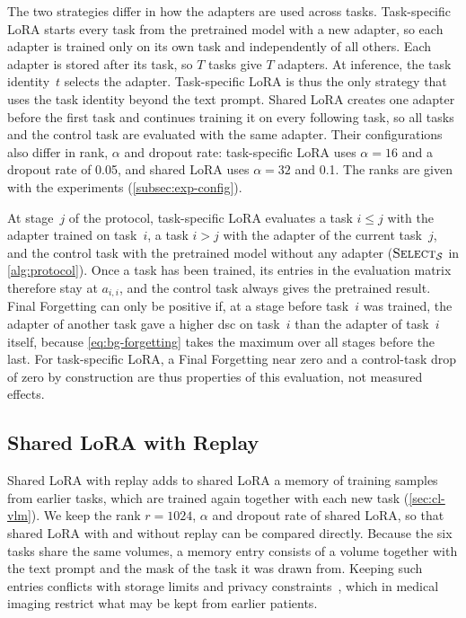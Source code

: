 The two strategies differ in how the adapters are used across tasks.
Task-specific LoRA starts every task from the pretrained model with a new adapter, so each adapter is trained only on its own task and independently of all others.
Each adapter is stored after its task, so $T$ tasks give $T$ adapters.
At inference, the task identity~$t$ selects the adapter.
Task-specific LoRA is thus the only strategy that uses the task identity beyond the text prompt.
Shared LoRA creates one adapter before the first task and continues training it on every following task, so all tasks and the control task are evaluated with the same adapter.
Their configurations also differ in rank, $\alpha$ and dropout rate: task-specific LoRA uses $\alpha = 16$ and a dropout rate of 0.05, and shared LoRA uses $\alpha = 32$ and 0.1.
The ranks are given with the experiments (\cref{subsec:exp-config}).

At stage~$j$ of the protocol, task-specific LoRA evaluates a task $i \le j$ with the adapter trained on task~$i$, a task $i > j$ with the adapter of the current task~$j$, and the control task with the pretrained model without any adapter ($\textsc{Select}_{\mathcal{S}}$ in \cref{alg:protocol}).
Once a task has been trained, its entries in the evaluation matrix therefore stay at $a_{i,i}$, and the control task always gives the pretrained result.
Final Forgetting can only be positive if, at a stage before task~$i$ was trained, the adapter of another task gave a higher \gls{dsc} on task~$i$ than the adapter of task~$i$ itself, because \cref{eq:bg-forgetting} takes the maximum over all stages before the last.
For task-specific LoRA, a Final Forgetting near zero and a control-task drop of zero by construction are thus properties of this evaluation, not measured effects.

\subsection{Shared LoRA with Replay}
\label{subsec:method-replay}

Shared LoRA with replay adds to shared LoRA a memory of training samples from earlier tasks, which are trained again together with each new task (\cref{sec:cl-vlm}).
We keep the rank $r = 1024$, $\alpha$ and dropout rate of shared LoRA, so that shared LoRA with and without replay can be compared directly.
Because the six tasks share the same volumes, a memory entry consists of a volume together with the text prompt and the mask of the task it was drawn from.
Keeping such entries conflicts with storage limits and privacy constraints~\cite[Sec.~1]{delange2022}, which in medical imaging restrict what may be kept from earlier patients.

